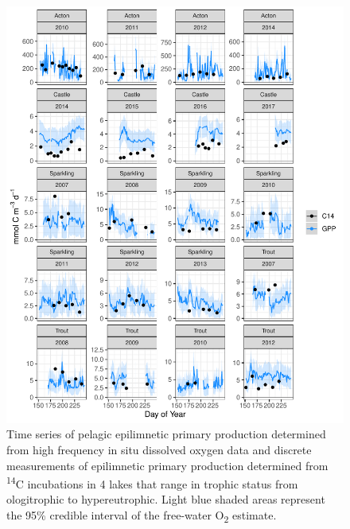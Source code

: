 \documentclass[12pt, oneside]{article}
\begin{document}
\newpage
\begin{figure}
\centering
\noindent\includegraphics{metabolism.pdf}
\noindent\caption{Time series of pelagic epilimnetic primary production determined from high frequency in situ dissolved oxygen data and discrete measurements of epilimnetic primary production determined from \textsuperscript{14}C incubations in 4 lakes that range in trophic status from ologitrophic to hypereutrophic. Light blue shaded areas represent the 95\% credible interval of the free-water O\textsubscript{2} estimate.}
\label{fig:timeseries}
\end{figure}%
\newpage
\end{document}
